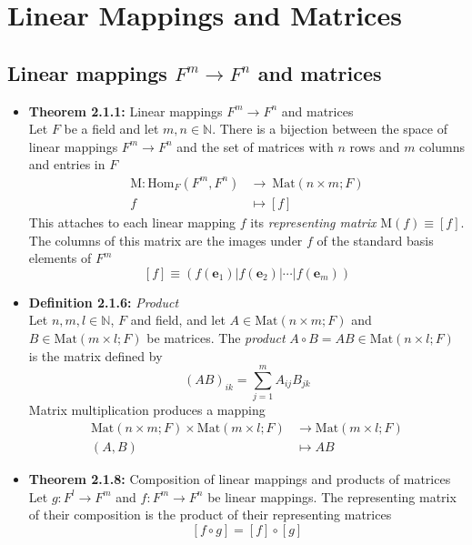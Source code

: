 \documentclass[11pt,a4paper]{article}
\begin{document}
\section{Linear Mappings and Matrices}

\subsection{Linear mappings $F^m \to F^n$ and matrices}

\begin{itemize}

    \item \textbf{Theorem 2.1.1:} Linear mappings $F^m \to F^n$ and matrices \\
        Let $F$ be a field and let $m, n \in \mathbb{N}$.
        There is a bijection between the space of linear mappings $F^m \to F^n$
        and the set of matrices with $n$ rows and $m$ columns and entries in $F$
        \begin{align*}{}
            \mathrm{M} : \text{Hom}_F(F^m, F^n) &\to \ \text{Mat}(n \times m ; F) \\
            f &\mapsto [f]
        \end{align*}
        This attaches to each linear mapping $f$ its \emph{representing matrix}
        $\mathrm{M}(f) \equiv [f]$.
        The columns of this matrix are the images under $f$ of the standard basis elements of $F^m$
        \[
            [f] \equiv (f(\textbf{e}_1)|f(\textbf{e}_2)| \cdots | f(\textbf{e}_m))
        \]

    \item \textbf{Definition 2.1.6:} \emph{Product} \\
        Let $n, m, l \in \mathbb{N}$, $F$ and field, and let
        $A \in \mathrm{Mat}(n \times m; F)$ and $B \in \mathrm{Mat}(m \times l; F)$
        be matrices.
        The \emph{product} $A \circ B = AB \in \mathrm{Mat}(n \times l; F)$
        is the matrix defined by
        \[
            {(AB)}_{ik} = \sum_{j=1}^m A_{ij}B_{jk}
        \]
        Matrix multiplication produces a mapping
        \begin{align*}{}
            \mathrm{Mat}(n \times m;F) \times \mathrm{Mat}(m \times l; F) &\to
            \mathrm{Mat}(m \times l; F) \\
            (A,B) &\mapsto AB
        \end{align*}

    \item \textbf{Theorem 2.1.8:} Composition of linear mappings and products of matrices \\
        Let $g : F^l \to F^m$ and $f : F^m \to F^n$ be linear mappings.
        The representing matrix of their composition is the product of their representing matrices
        \[
            [f \circ g] = [f] \circ [g]
        \]


\end{itemize}
\end{document}

